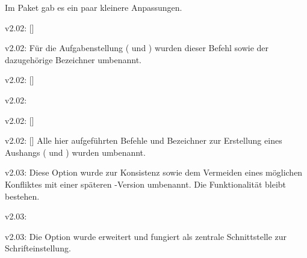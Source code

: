 %
\begin{Entity}{}
Im Paket  gab es ein paar kleinere Anpassungen.
\begin{Obsolete}{v2.02:}
  {[]}
\begin{Obsolete}{v2.02:}
  {}
\printobsoletelist%
%
Für die Aufgabenstellung ( und ) wurden 
dieser Befehl sowie der dazugehörige Bezeichner umbenannt.
\end{Obsolete}
\end{Obsolete}

\begin{Obsolete}{v2.02:}
  {[]}
\begin{Obsolete}{v2.02:}
  {}
\begin{Obsolete}{v2.02:}
  {[]}
\begin{Obsolete}{v2.02:}
  {[]}
\printobsoletelist%
%
Alle hier aufgeführten Befehle und Bezeichner zur Erstellung eines Aushangs 
( und ) wurden umbenannt.
\end{Obsolete}
\end{Obsolete}
\end{Obsolete}
\end{Obsolete}
\end{Entity}


\begin{Obsolete}{v2.03:}
  {}
\printobsoletelist%
%
Diese Option wurde zur Konsistenz sowie dem Vermeiden eines möglichen 
Konfliktes mit einer späteren \KOMAScript-Version umbenannt. Die Funktionalität 
bleibt bestehen.
\end{Obsolete}

\begin{Obsolete}{v2.03:}
  {}
\begin{Obsolete}{v2.03:}
  {}
\printobsoletelist%
%
Die Option  wurde erweitert und fungiert als zentrale 
Schnittstelle zur Schrifteinstellung. 
\end{Obsolete}
\end{Obsolete}

